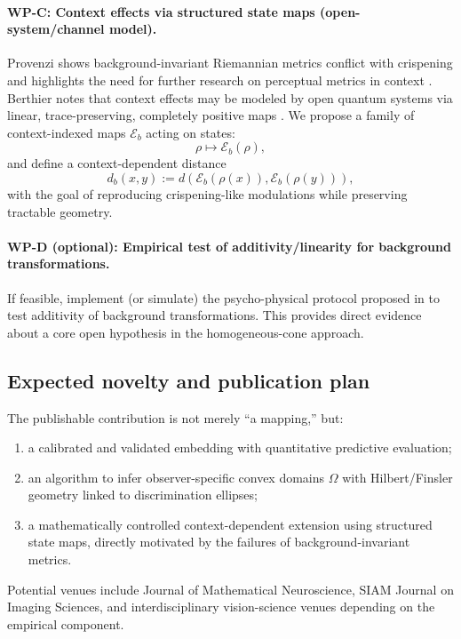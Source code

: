 \documentclass[11pt]{article}
\begin{document}
\paragraph{WP-C: Context effects via structured state maps (open-system/channel model).}
Provenzi shows background-invariant Riemannian metrics conflict with crispening and highlights the need for further research on perceptual metrics in context \cite{Provenzi2020}.
Berthier notes that context effects may be modeled by open quantum systems via linear, trace-preserving, completely positive maps \cite{Berthier2020}.
We propose a family of context-indexed maps $\mathcal{E}_b$ acting on states:
\[
\rho \mapsto \mathcal{E}_b(\rho),
\]
and define a context-dependent distance
\[
d_b(x,y):=d\!\left(\mathcal{E}_b(\rho(x)),\mathcal{E}_b(\rho(y))\right),
\]
with the goal of reproducing crispening-like modulations while preserving tractable geometry.

\paragraph{WP-D (optional): Empirical test of additivity/linearity for background transformations.}
If feasible, implement (or simulate) the psycho-physical protocol proposed in \cite{Provenzi2020} to test additivity of background transformations.
This provides direct evidence about a core open hypothesis in the homogeneous-cone approach.

\subsection{Expected novelty and publication plan}
The publishable contribution is not merely ``a mapping,'' but:
\begin{enumerate}[leftmargin=2.2em]
\item a calibrated and validated embedding with quantitative predictive evaluation;
\item an algorithm to infer observer-specific convex domains $\Omega$ with Hilbert/Finsler geometry linked to discrimination ellipses;
\item a mathematically controlled context-dependent extension using structured state maps, directly motivated by the failures of background-invariant metrics.
\end{enumerate}
Potential venues include Journal of Mathematical Neuroscience, SIAM Journal on Imaging Sciences, and interdisciplinary vision-science venues depending on the empirical component.
\end{document}
